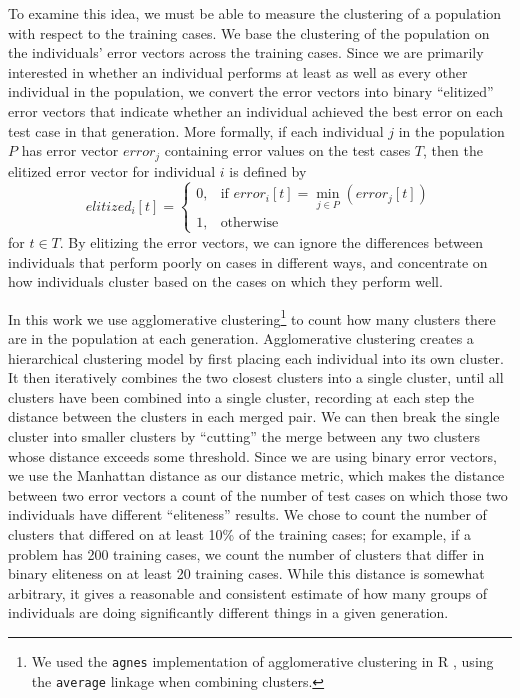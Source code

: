 To examine this idea, we must be able to measure the clustering of a population with respect to the training cases. We base the clustering of the population on the individuals' error vectors across the training cases.
Since we are primarily interested in whether an individual performs at least as well as every other 
individual in the population, we convert the error vectors into binary ``elitized'' error vectors 
that indicate whether an individual achieved the best error on each test case in that generation. 
More formally, if each individual $j$ in the population $P$ has error vector $\mathit{error}_j$ containing error values on the test cases $T$, then the elitized error vector for individual $i$ is defined by
\[
\mathit{elitized}_i[t] =
\begin{cases}
    0,         & \text{if } \mathit{error}_i[t] = \min\limits_{j \in P} (\mathit{error}_j[t])  \\
    1,         & \text{otherwise}
\end{cases}
\]
for $t \in T$.
By elitizing the error vectors, we can ignore the differences between individuals that perform poorly on cases in different 
ways, and concentrate on how individuals cluster based on the cases on which they perform well.

In this work we use agglomerative clustering\footnote{We used the \texttt{agnes} \citep{cluster} implementation of 
	agglomerative clustering in R \citep{R}, using the \texttt{average} linkage when 
	combining clusters.} to count how many clusters there are in the population 
at each generation. Agglomerative clustering creates 
a hierarchical clustering model by first placing each individual into its own cluster. It then 
iteratively combines the two closest clusters into a single cluster, until all clusters have been 
combined into a single cluster, recording at each step the distance between the clusters in each merged pair. 
We can then break the single cluster into smaller clusters by
``cutting'' the merge between any two clusters whose distance exceeds some threshold.
Since we are using binary error vectors, we use the 
Manhattan distance as our distance metric, which makes the distance between two error vectors
a count of the number of test cases on which those two individuals have different ``eliteness'' 
results.
We chose to count the number of clusters that differed on at least 10\% of the training cases; 
for example, if a problem has 200 training cases, we count the number of clusters that differ
in binary eliteness on at least 20 training cases. While this distance is somewhat arbitrary, 
it gives a reasonable and consistent estimate of how many groups of individuals are doing 
significantly different things in a given generation.

